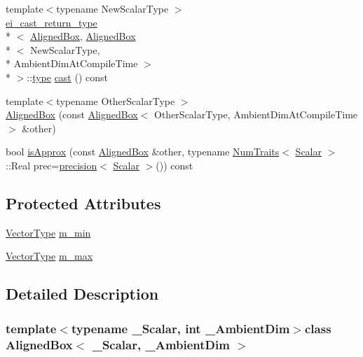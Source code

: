 \begin{DoxyCompactItemize}
\item 
{\footnotesize template$<$typename New\-Scalar\-Type $>$ }\\\hyperlink{structei__cast__return__type}{ei\-\_\-cast\-\_\-return\-\_\-type}\\*
$<$ \hyperlink{class_aligned_box}{Aligned\-Box}, \hyperlink{class_aligned_box}{Aligned\-Box}\\*
$<$ New\-Scalar\-Type, \\*
Ambient\-Dim\-At\-Compile\-Time $>$\\*
 $>$\-::\hyperlink{glext_8h_a7d05960f4f1c1b11f3177dc963a45d86}{type} \hyperlink{class_aligned_box_a7a7219fdfe2475d4de3c74d6f2603610}{cast} () const 
\item 
{\footnotesize template$<$typename Other\-Scalar\-Type $>$ }\\\hyperlink{class_aligned_box_a8a0ae2d9bd64ff8e1ac357aad83fbaac}{Aligned\-Box} (const \hyperlink{class_aligned_box}{Aligned\-Box}$<$ Other\-Scalar\-Type, Ambient\-Dim\-At\-Compile\-Time $>$ \&other)
\item 
bool \hyperlink{class_aligned_box_aa34177089c40db3dbf62c7564a336c6e}{is\-Approx} (const \hyperlink{class_aligned_box}{Aligned\-Box} \&other, typename \hyperlink{struct_num_traits}{Num\-Traits}$<$ \hyperlink{class_aligned_box_a9657f66d123142ede4a4c9c12768b187}{Scalar} $>$\-::Real prec=\hyperlink{_math_functions_8h_a3dc1c65cf9dc9b5a7ee66472d0ae83e1}{precision}$<$ \hyperlink{class_aligned_box_a9657f66d123142ede4a4c9c12768b187}{Scalar} $>$()) const 
\end{DoxyCompactItemize}
\subsection*{Protected Attributes}
\begin{DoxyCompactItemize}
\item 
\hyperlink{class_aligned_box_a0c3d2a6c755e0ad65a6e45371a4079ef}{Vector\-Type} \hyperlink{class_aligned_box_ae25b586e6518366ce238a5a58d026770}{m\-\_\-min}
\item 
\hyperlink{class_aligned_box_a0c3d2a6c755e0ad65a6e45371a4079ef}{Vector\-Type} \hyperlink{class_aligned_box_a10b7690d3a414b036b6db22577a24b57}{m\-\_\-max}
\end{DoxyCompactItemize}


\subsection{Detailed Description}
\subsubsection*{template$<$typename \-\_\-\-Scalar, int \-\_\-\-Ambient\-Dim$>$class Aligned\-Box$<$ \-\_\-\-Scalar, \-\_\-\-Ambient\-Dim $>$}

